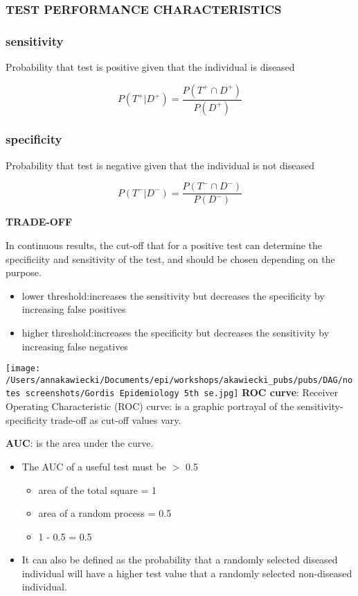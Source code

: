 \documentclass[
]{article}
\providecommand{\tightlist}{%
  \setlength{\itemsep}{0pt}\setlength{\parskip}{0pt}}
\begin{document}
\hypertarget{test-performance-characteristics}{%
\subsubsection{TEST PERFORMANCE
CHARACTERISTICS}\label{test-performance-characteristics}}

\hypertarget{sensitivity}{%
\subsubsection{sensitivity}\label{sensitivity}}

Probability that test is positive given that the individual is diseased

\[P(T^+|D^+)= \frac{P(T^+ \cap D^+)}{P(D^+)}\]

\hypertarget{specificity}{%
\subsubsection{specificity}\label{specificity}}

Probability that test is negative given that the individual is not
diseased

\[P(T^-|D^-)= \frac{P(T^- \cap D^-)}{P(D^-)}\]

\textbf{TRADE-OFF}

In continuous results, the cut-off that for a positive test can
determine the specificiity and sensitivity of the test, and should be
chosen depending on the purpose.

\begin{itemize}
\item
  lower threshold:increases the sensitivity but decreases the
  specificity by increasing false positives
\item
  higher threshold:increases the specificity but decreases the
  sensitivity by increasing false negatives
\end{itemize}

\texttt{[image: /Users/annakawiecki/Documents/epi/workshops/akawiecki\_pubs/pubs/DAG/notes screenshots/Gordis Epidemiology 5th se.jpg]}
\textbf{ROC curve}: Receiver Operating Characteristic (ROC) curve: is a
graphic portrayal of the sensitivity-specificity trade-off as cut-off
values vary.

\textbf{AUC}: is the area under the curve.

\begin{itemize}
\tightlist
\item
  The AUC of a useful test must be \(>\) 0.5

  \begin{itemize}
  \tightlist
  \item
    area of the total square = 1
  \item
    area of a random process = 0.5
  \item
    1 - 0.5 = 0.5
  \end{itemize}
\item
  It can also be defined as the probability that a randomly selected
  diseased individual will have a higher test value that a randomly
  selected non-diseased individual.
\end{itemize}
\end{document}
